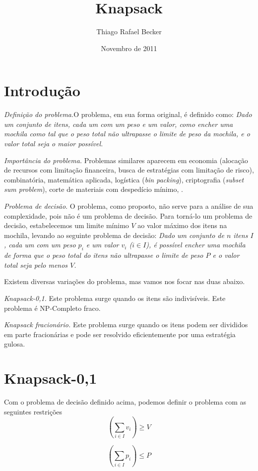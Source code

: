 \documentclass[a4paper]{article}
\title{Knapsack}
\date{Novembro de 2011}
\author{Thiago Rafael Becker}
\begin{document}
\maketitle
\section*{Introdução}
{\it Definição do problema.}O problema, em sua forma original, é definido como: {\it Dado um conjunto de itens, cada um com um peso e um valor, como encher uma mochila como tal que o 	peso total não ultrapasse o limite de peso da mochila, e o valor total seja o maior possível.}

{\it Importância do problema.} Problemas similares aparecem em economia (alocação de recursos com limitação financeira, busca de estratégias com limitação de risco), combinatória, matemática aplicada, logística ({\it bin packing}), criptografia ({\it subset sum problem}), corte de materiais com despedício mínimo, .

{\it Problema de decisão}. O problema, como proposto, não serve para a análise de sua complexidade, pois não é um problema de decisão. Para torná-lo um problema de decisão, estabelecemos um limite mínimo $V$ ao valor máximo dos itens na mochila, levando ao seguinte problema de decisão: {\it Dado um conjunto de $n$ itens $I$, cada um com um peso $p_i$ e um valor $v_i$ ($i \in I$), é possível encher uma mochila de forma que o peso total do itens não ultrapasse o limite de peso $P$ e o valor total seja pelo menos $V$.}

Existem diversas variações do problema, mas vamos nos focar nas duas abaixo.

{\it Knapsack-0,1.} Este problema surge quando os itens são indivisíveis. Este problema é NP-Completo fraco.

{\it Knapsack fracionário.} Este problema surge quando os itens podem ser divididos em parte fracionárias e pode ser resolvido eficientemente por uma estratégia gulosa.

\section*{Knapsack-0,1}
Com o problema de decisão definido acima, podemos definir o problema com as seguintes restrições
\begin{equation}
\label{restricao:1}
\left(\sum_{i \in I} v_i\right) \ge V
\end{equation}

\begin{equation}
\label{restricao:2}
\left(\sum_{i \in I} p_i\right) \le P
\end{equation}
\end{document}
